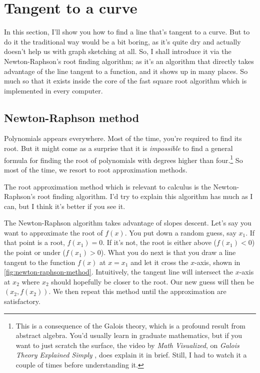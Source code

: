 \section{Tangent to a curve}

In this section, I'll show you how to find a line that's tangent to a curve. But to do it the traditional way would be a bit boring, as it's quite dry and actually doesn't help us with graph sketching at all. So, I shall introduce it via the Newton-Raphson's root finding algorithm; as it's an algorithm that directly takes advantage of the line tangent to a function, and it shows up in many places. So much so that it exists inside the core of the fast square root algorithm which is implemented in every computer.

\subsection{Newton-Raphson method}

Polynomials appears everywhere. Most of the time, you're required to find its root. But it might come as a surprise that it is \emph{impossible} to find a general formula for finding the root of polynomials with degrees higher than four.\footnote{This is a consequence of the Galois theory, which is a profound result from abstract algebra. You'd usually learn in graduate mathematics, but if you want to just scratch the surface, the video by \emph{Math Visualized}, on \emph{Galois Theory Explained Simply} \cite{galois-explained-2020}, does explain it in brief. Still, I had to watch it a couple of times before understanding it.} So most of the time, we resort to root approximation methods.

The root approximation method which is relevant to calculus is the Newton-Raphson's root finding algorithm. I'd try to explain this algorithm has much as I can, but I think it's better if you see it.

The Newton-Raphson algorithm takes advantage of slopes descent. Let's say you want to approximate the root of $f(x)$. You put down a random guess, say $x_1$. If that point is a root, $f(x_1) = 0$. If it's not, the root is either above ($f(x_1) < 0$) the point or under ($f(x_1) > 0$). What you do next is that you draw a line tangent to the function $f(x)$ at $x = x_1$ and let it cross the $x$-axis, shown in \cref{fig:newton-raphson-method}. Intuitively, the tangent line will intersect the $x$-axis at $x_2$ where $x_2$ should hopefully be closer to the root. Our new guess will then be $(x_2, f(x_2))$. We then repeat this method until the approximation are satisfactory.

